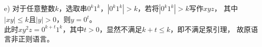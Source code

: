 \begin{solution}
    e) 对于任意整数$k$，选取串$0^k1^k$，$|0^k1^k|>k$，若将$|0^k1^k|>k$写作$xyz$，
    其中$|xy| \le k$且$|y| > 0$，则$y=0^{t}$。\\
    此时$xy^2z = 0^{k+t}1^k$，其中$t > 0$，显然不满足$k+t\le k$，即不满足泵引理，
    故原语言非正则语言。
\end{solution}